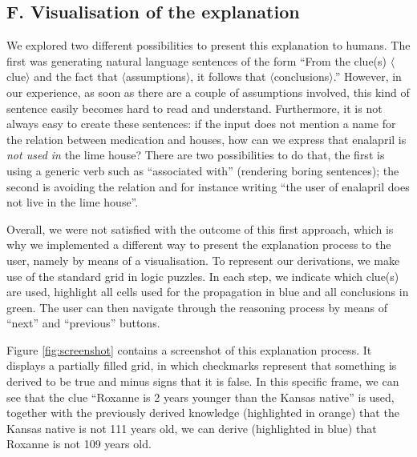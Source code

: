 \subsection{F. Visualisation of the explanation}
We explored two different possibilities to present this explanation to humans. 
The first was generating natural language sentences of the form 
``From the clue(s) $\langle$clue$\rangle$ and the fact that $\langle$assumptions$\rangle$, it follows that $\langle$conclusions$\rangle$.''
However, in our experience, as soon as there are a couple of assumptions involved, this kind of sentence easily becomes hard to read and understand. Furthermore, it is not always easy to create these sentences: if the input does not mention a name for the relation between medication and houses, how can we express that enalapril is \emph{not used in} the lime house? 
There are two possibilities to do that, the first is using a generic verb such as ``associated with'' (rendering boring sentences); the second is avoiding the relation and for instance writing ``the user of enalapril does not live in the lime house''. 

Overall, we were not satisfied with the outcome of this first approach, which is why we implemented a different way to present the explanation process to the user, namely by means of a visualisation. To represent our derivations, we make use of the standard grid in logic puzzles. In each step, we indicate which clue(s) are used, highlight all cells used for the propagation in blue and all conclusions in green. 
The user can then navigate through the reasoning process by means of ``next'' and ``previous'' buttons. 

Figure \ref{fig:screenshot} contains a screenshot of this explanation process. 
It displays a partially filled grid, in which checkmarks represent that something is derived to be true and minus signs that it is false. 
In this specific frame, we can see that the clue ``Roxanne is 2 years younger than the Kansas native'' is used, together with the previously derived knowledge (highlighted in orange) that the Kansas native is not 111 years old, we can derive (highlighted in blue) that Roxanne is not 109 years old.

